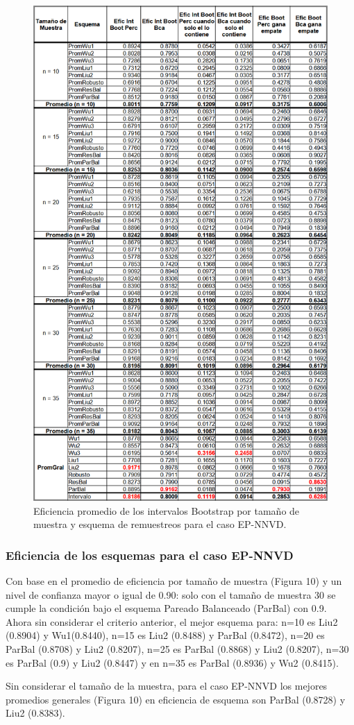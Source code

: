 \begin{figure}[ht] 
	\centering 
	\includegraphics[width=0.55\linewidth]{img/EP_NNVD_Efic_Boots.png} 
	\caption{Eficiencia promedio de los intervalos Bootstrap por tamaño de muestra y esquema de remuestreos para el caso EP-NNVD.} 
	\label{fig:EP_NNVD_Boots}
\end{figure}
\FloatBarrier

\subsubsection{Eficiencia de los esquemas para el caso EP-NNVD}
Con base en el promedio de eficiencia por tamaño de muestra (Figura 10) y un nivel de confianza mayor o igual de 0.90: solo con el tamaño de muestra 30 se cumple la condición bajo el esquema Pareado Balanceado (ParBal) con 0.9. Ahora sin considerar el criterio anterior, el mejor esquema para: n=10 es Liu2 (0.8904) y Wu1(0.8440), n=15 es Liu2 (0.8488) y ParBal (0.8472), n=20 es ParBal (0.8708) y Liu2 (0.8207), n=25 es ParBal (0.8868) y Liu2 (0.8207), n=30 es ParBal (0.9) y Liu2 (0.8447) y en n=35 es ParBal (0.8936) y Wu2 (0.8415).  
\vspace{.5cm}


Sin considerar el tamaño de la muestra, para el caso EP-NNVD los mejores promedios generales (Figura 10) en eficiencia de esquema son ParBal (0.8728) y Liu2 (0.8383).


